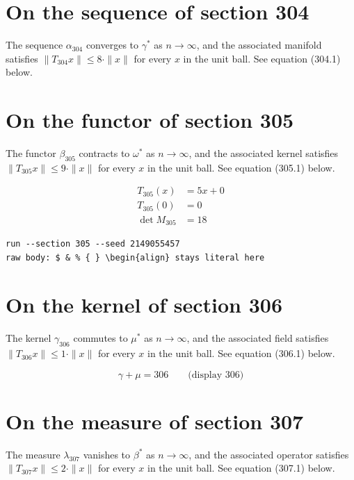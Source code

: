 \documentclass{article}
\begin{document}
\section{On the sequence of section 304}
The sequence $\alpha_{304}$ converges to $\gamma^{*}$ as $n \to \infty$,
and the associated manifold satisfies $\|T_{304} x\| \leq 8 \cdot \|x\|$
for every $x$ in the unit ball. See equation (304.1) below.

\section{On the functor of section 305}
The functor $\beta_{305}$ contracts to $\omega^{*}$ as $n \to \infty$,
and the associated kernel satisfies $\|T_{305} x\| \leq 9 \cdot \|x\|$
for every $x$ in the unit ball. See equation (305.1) below.

\begin{align}
T_{305}(x) &= 5 x + 0 \\
T_{305}(0) &= 0 \\
\det M_{305} &= 18
\end{align}

\begin{verbatim}
run --section 305 --seed 2149055457
raw body: $ & % { } \begin{align} stays literal here
\end{verbatim}

\section{On the kernel of section 306}
The kernel $\gamma_{306}$ commutes to $\mu^{*}$ as $n \to \infty$,
and the associated field satisfies $\|T_{306} x\| \leq 1 \cdot \|x\|$
for every $x$ in the unit ball. See equation (306.1) below.

$$
\gamma + \mu = 306 \qquad \text{(display 306)}
$$

\section{On the measure of section 307}
The measure $\lambda_{307}$ vanishes to $\beta^{*}$ as $n \to \infty$,
and the associated operator satisfies $\|T_{307} x\| \leq 2 \cdot \|x\|$
for every $x$ in the unit ball. See equation (307.1) below.
\end{document}
